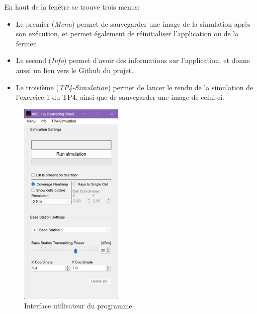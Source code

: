 En haut de la fenêtre se trouve trois menus:
\begin{itemize}
    \item Le premier (\textit{Menu}) permet de sauvegarder une image de la simulation après son exécution, et permet également de réinitialiser l'application ou de la fermer.
    \item Le second (\textit{Info}) permet d'avoir des informations sur l'application, et donne aussi un lien vers le Github du projet.
    \item Le troisième (\textit{TP4-Simulation}) permet de lancer le rendu de la simulation de l'exercice 1 du TP4, ainsi que de sauvegarder une image de celui-ci.
\end{itemize}

\begin{figure}[H]
    \centering
    \includegraphics[width=0.44\textwidth]{latex/images/interface.png}
    \caption{Interface utilisateur du programme}
    \label{fig:interface}
\end{figure}

